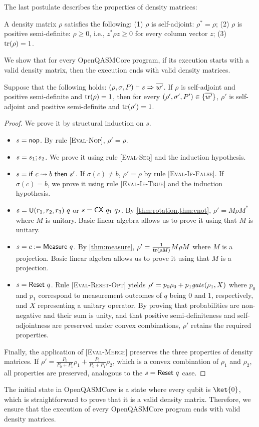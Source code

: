 The last postulate describes the properties of density matrices:
%
\begin{postulate}
	\label{pos:density}
	A density matrix $\rho$ satisfies the following:
	(1) $\rho$ is self-adjoint: $\rho^*=\rho$;
	(2) $\rho$ is positive semi-definite: $\rho\ge0$, i.e., $z^*\rho z\ge 0$ for every
	column vector $z$;
	(3) $\trace{\rho}=1$.
\end{postulate}
%
\noindent
%
We show that for every OpenQASMCore program, if its execution starts with a
valid density matrix, then the execution ends with valid density matrices.
%
\begin{theorem}
	Suppose that the following holds:
	$\eval{(\rho,\sigma,P)}{s}{\rep{w'}}$.
	If $\rho$ is self-adjoint and positive semi-definite and $\trace{\rho}=1$, then
	for every $(\rho',\sigma',P')\in\{\rep{w'}\}$, $\rho'$ is self-adjoint and
	positive semi-definite and $\trace{\rho'}=1$.
\end{theorem}
%
\begin{proof} We prove it by structural induction on $s$.
	\begin{itemize}
		\item $s=\inop$.
		      By rule [\textsc{Eval-Nop}], $\rho'=\rho$.
		\item $s=\iseq{s_1}{s_2}$.
		      We prove it using rule [\textsc{Eval-Seq}] and the induction hypothesis.
		\item $s=\iif{c}{b}{s'}$.
		      If $\sigma(c)\not=b$, $\rho'=\rho$ by rule [\textsc{Eval-If-False}].
		      If $\sigma(c)=b$, we prove it using rule [\textsc{Eval-If-True}] and the
		      induction hypothesis.
		\item $s=\irotate{r_1}{r_2}{r_3}{q}$ or $s=\icnot{q_1}{q_2}$.
		      By \cref{thm:rotation,thm:cnot}, $\rho'=M\rho M^*$ where $M$ is unitary.
		      Basic linear algebra allows us to prove it using that $M$ is unitary.
		\item $s=\imeasure{q}{c}$.
		      By \cref{thm:measure}, $\rho'=\frac{1}{\trace{\rho M}}M\rho M$ where $M$ is a
		      projection.
		      Basic linear algebra allows us to prove it using that $M$ is a projection.
		\item $s=\ireset{q}$.
		      Rule [\textsc{Eval-Reset-Opt}] yields $\rho'=p_0\rho_0 +
			      p_1\sunitary{\rho_1}{X}$ where $p_0$ and $p_1$ correspond to measurement
		      outcomes of $q$ being 0 and 1, respectively, and $X$ representing a unitary
		      operator.
		      By proving that probabilities are non-negative and their sum is unity, and that
		      positive semi-definiteness and self-adjointness are preserved under convex
		      combinations, $\rho'$ retains the required properties.
	\end{itemize}
	Finally, the application of [\textsc{Eval-Merge}] preserves the three
	properties of density matrices.
	If $\rho' = \frac{P_0}{P_0+P_1}\rho_1 + \frac{P_1}{P_0+P_1}\rho_2$, which is a
	convex combination of $\rho_1$ and $\rho_2$, all properties are preserved,
	analogous to the $s=\ireset{q}$ case.
\end{proof}

\noindent
%
The initial state in OpenQASMCore is a state where every qubit is $\ket{0}$,
which is straightforward to prove that it is a valid density matrix.
%
Therefore, we ensure that the execution of every OpenQASMCore program ends with
valid density matrices.
